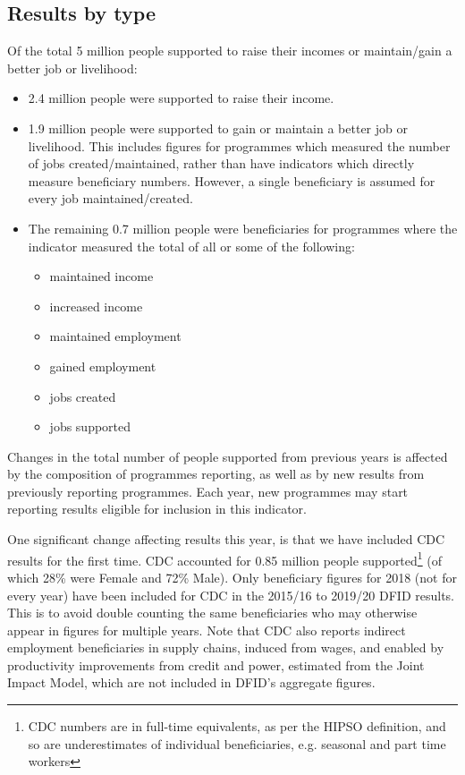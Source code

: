 \subsection{Results by type}
Of the total 5 million people supported to raise their incomes or maintain/gain a better job or livelihood:

\begin{itemize}
\item 2.4 million people were supported to raise their income.
\item 1.9 million people were supported to gain or maintain a better job or livelihood. %
This includes figures for programmes which measured the number of jobs created/maintained, rather than have indicators which directly measure beneficiary numbers. %
However, a single beneficiary is assumed for every job maintained/created. %
\item The remaining 0.7 million people were beneficiaries for programmes where the indicator measured the total of all or some of the following:
	\begin{itemize}
		\item maintained income
		\item increased income
		\item maintained employment
		\item gained employment
		\item jobs created
		\item jobs supported
	\end{itemize}
\end{itemize}

Changes in the total number of people supported from previous years is affected by the composition of programmes reporting, as well as by new results from previously reporting programmes. %
Each year, new programmes may start reporting results eligible for inclusion in this indicator.  %

One significant change affecting results this year, is that we have included CDC results for the first time. %
CDC accounted for 0.85 million people supported\footnote{CDC numbers are in full-time equivalents, as per the HIPSO definition, and so are underestimates of individual beneficiaries, e.g. seasonal and part time workers} (of which 28\% were Female and 72\% Male). %
Only beneficiary figures for 2018 (not for every year) have been included for CDC in the 2015/16 to 2019/20 DFID results. %
This is to avoid double counting the same beneficiaries who may otherwise appear in figures for multiple years. %
Note that CDC also reports indirect employment beneficiaries in supply chains, induced from wages, and enabled by productivity improvements from credit and power, estimated from the Joint Impact Model, which are not included in DFID's aggregate figures.%


